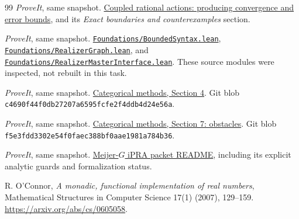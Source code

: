 \begin{thebibliography}{99}
\emph{ProveIt}, same snapshot.
\href{https://github.com/VladimirReshetnikov/ProveIt/blob/b2341af5370cd8a43f72ebb2341c0d7d7395b634/Logic/PrimitiveRecursiveArithmetic/docs/proofs/foundations/ipra_coupled_refinement_2026-11-19/paper/sections/03_coupled.tex}{Coupled rational actions: producing convergence and error bounds}, and its \emph{Exact boundaries and counterexamples} section.

\emph{ProveIt}, same snapshot.
\href{https://github.com/VladimirReshetnikov/ProveIt/blob/b2341af5370cd8a43f72ebb2341c0d7d7395b634/Logic/PrimitiveRecursiveArithmetic/Derivations/Lean/IPRADerivations/Foundations/BoundedSyntax.lean}{\texttt{Foundations/BoundedSyntax.lean}},
\href{https://github.com/VladimirReshetnikov/ProveIt/blob/b2341af5370cd8a43f72ebb2341c0d7d7395b634/Logic/PrimitiveRecursiveArithmetic/Derivations/Lean/IPRADerivations/Foundations/RealizerGraph.lean}{\texttt{Foundations/RealizerGraph.lean}}, and
\href{https://github.com/VladimirReshetnikov/ProveIt/blob/b2341af5370cd8a43f72ebb2341c0d7d7395b634/Logic/PrimitiveRecursiveArithmetic/Derivations/Lean/IPRADerivations/Foundations/RealizerMasterInterface.lean}{\texttt{Foundations/RealizerMasterInterface.lean}}.
These source modules were inspected, not rebuilt in this task.

\emph{ProveIt}, same snapshot.
\href{https://github.com/VladimirReshetnikov/ProveIt/blob/b2341af5370cd8a43f72ebb2341c0d7d7395b634/Logic/PrimitiveRecursiveArithmetic/docs/proofs/foundations/ipra_categorical_methods/paper/sections/04_categories.tex}{Categorical methods, Section 4}.
Git blob \texttt{c4690f44f0db27207a6595fcfe2f4ddb4d24e56a}.

\emph{ProveIt}, same snapshot.
\href{https://github.com/VladimirReshetnikov/ProveIt/blob/b2341af5370cd8a43f72ebb2341c0d7d7395b634/Logic/PrimitiveRecursiveArithmetic/docs/proofs/foundations/ipra_categorical_methods/paper/sections/07_obstacles.tex}{Categorical methods, Section 7: obstacles}.
Git blob \texttt{f5e3fdd3302e54f0faec388bf0aae1981a784b36}.

\emph{ProveIt}, same snapshot.
\href{https://github.com/VladimirReshetnikov/ProveIt/blob/b2341af5370cd8a43f72ebb2341c0d7d7395b634/Logic/PrimitiveRecursiveArithmetic/docs/proofs/analysis/meijer_g_ipra_2026-11-16/README.md}{Meijer-$G$ iPRA packet README}, including its explicit analytic guards and formalization status.

R. O'Connor, \emph{A monadic, functional implementation of real numbers},
Mathematical Structures in Computer Science 17(1) (2007), 129--159.
\url{https://arxiv.org/abs/cs/0605058}.


\end{thebibliography}
